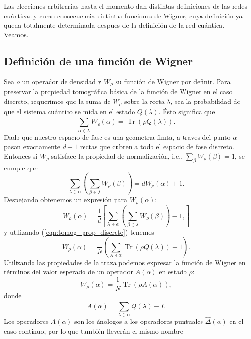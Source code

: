 \documentclass[a4paper]{report}
\DeclareMathOperator{\Tr}{Tr}
\begin{document}
  Las elecciones arbitrarias hasta el momento
  dan distintas definiciones de las redes cuánticas y como
  consecuencia distintas funciones de Wigner, cuya
  definición ya queda totalmente determinada despues de la
  definición de la red cuántica. Veamos.

  \subsection{Definición de una función de Wigner}

  Sea $\rho$ un operador de densidad y $W_\rho$ su función
  de Wigner por definir. Para preservar la propiedad
  tomográfica básica de la función de Wigner en el caso
  discreto, requerimos que la suma de $W_\rho$ sobre la
  recta $\lambda$, sea la probabilidad de que el sistema
  cuántico se mida en el estado $Q(\lambda)$. Ésto significa
  que 
  \begin{equation}
    \label{eqn:tomog_prop_discrete}
    \sum_{\alpha \in \lambda}^{} W_\rho(\alpha)
    = \Tr\left( \rho Q(\lambda) \right).
  \end{equation}
  Dado que nuestro espacio de fase es una geometría finita,
  a traves del punto $\alpha$ pasan exactamente $d+1$
  rectas que cubren a todo el espacio de fase discreto.
  Entonces si $W_\rho$ satisface la propiedad de
  normalización, i.e., $\sum_\beta W_\rho(\beta) = 1$, se
  cumple que
  \begin{equation}
    \sum_{\lambda \ni \alpha}^{}
    \left( \sum_{\beta \in \lambda}^{} W_\rho(\beta) \right) 
    = d W_\rho(\alpha) + 1.
  \end{equation}
  Despejando obtenemos un expresión para $W_\rho(\alpha)$:
  \[
    W_\rho(\alpha)
    = \frac{1}{d}
    \left[
      \sum_{\lambda \ni \alpha}^{}
      \left(
        \sum_{\beta \in \lambda}^{} W_\rho(\beta)
      \right) - 1,
    \right]
  \] 
  y utilizando (\ref{eqn:tomog_prop_discrete}) tenemos
  \begin{equation}
    W_\rho(\alpha)
    = \frac{1}{N} \left( \sum_{\lambda \ni \alpha}^{}
    \Tr\left( \rho Q(\lambda) \right) - 1 \right).
  \end{equation}
  Utilizando las propiedades de la traza podemos expresar
  la función de Wigner en términos del valor esperado de un
  operador $A(\alpha)$ en estado $\rho$:
  \begin{equation}
    \label{eqn:discrete_wigner}
    W_\rho(\alpha)
    = \frac{1}{N} \Tr\left( \rho A(\alpha) \right),
  \end{equation} 
  donde 
  \begin{equation}
    \label{eqn:discrete_point_op}
    A(\alpha)
    = \sum_{\lambda \ni \alpha}^{} Q(\lambda) - I.
  \end{equation} 
  Los operadores $A(\alpha)$ son los ánologos a los
  operadores puntuales $\hat \Delta(\alpha)$ en el caso
  continuo, por lo que también lleverán el mismo nombre.
\end{document}
